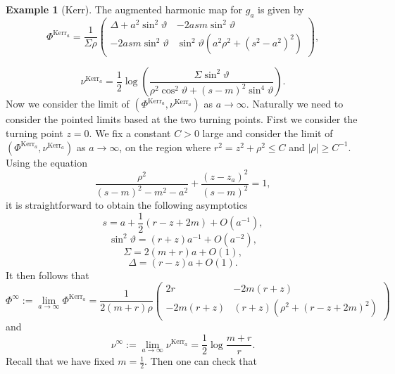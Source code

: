 \documentclass[a4paper,11pt]{amsart}
\theoremstyle{definition}
\newtheorem{example}[theorem]{Example}
\numberwithin{equation}{section}
\DeclareMathOperator{\Kerr}{Kerr}
\begin{document}
\begin{example}[Kerr]
The augmented harmonic map for $g_a$ is given by 
\begin{equation}
    \Phi^{\Kerr_a}=\frac{1}{\Sigma\rho}\left(\begin{matrix} \Delta+a^2\sin^2\vartheta  & -2asm\sin^2\vartheta\\ -2asm\sin^2\vartheta & \sin^2\vartheta(a^2\rho^2+(s^2-a^2)^2)\end{matrix}\right),
    \end{equation}
    
    \begin{equation} \nu^{\Kerr_a}=\frac{1}{2}\log(\frac{\Sigma\sin^2\vartheta}{\rho^2\cos^2\vartheta+(s-m)^2\sin^4\vartheta}).
\end{equation}
Now we consider the limit of $(\Phi^{\Kerr_a}, \nu^{\Kerr_a})$ as $a\rightarrow\infty$.  Naturally we need to consider  the pointed limits based at the two turning points. First we consider the turning point $z=0$. We fix a constant $C>0$ large and consider the limit of $(\Phi^{\Kerr_a}, \nu^{\Kerr_a})$ as $a\rightarrow\infty$, on the region where $r^2=z^2+\rho^2\leq C$ and $|\rho|\geq C^{-1}$. Using the equation 
\begin{equation}\frac{\rho^2}{(s-m)^2-m^2-a^2}+\frac{(z-z_a)^2}{(s-m)^2}=1,
\end{equation}it is straightforward to obtain the following asymptotics 
\begin{equation}
    s=a+\frac{1}{2}(r-z+2m)+O(a^{-1}),
\end{equation}
\begin{equation}
    \sin^2\vartheta=(r+z)a^{-1}+O(a^{-2}),
\end{equation}
\begin{equation}
    \Sigma=2(m+r)a+O(1),
\end{equation}
\begin{equation}
    \Delta=(r-z)a+O(1).
\end{equation}
It then follows that 
\begin{equation}
\Phi^\infty:=\lim_{a\rightarrow\infty}\Phi^{\Kerr_a}=\frac{1}{2(m+r)\rho}\left(\begin{matrix} 2r & -2m(r+z)\\ -2m(r+z) & (r+z)(\rho^2+(r-z+2m)^2)\end{matrix}\right)
\end{equation}
and 
\begin{equation}
    \nu^\infty:=\lim_{a\rightarrow\infty}\nu^{\Kerr_a}=\frac{1}{2}\log \frac{m+r}{r}.
\end{equation}
Recall that we have fixed $m=\frac{1}{2}$. Then one can check that 

\end{example}
\end{document}
